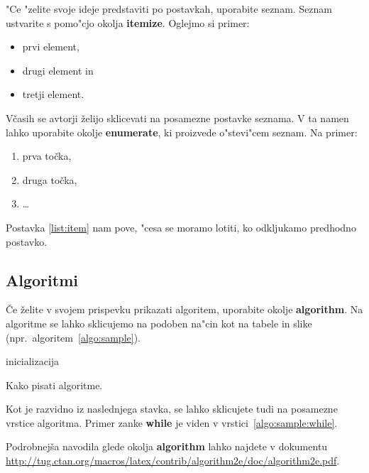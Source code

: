 \documentclass[sigconf,nonacm]{acmart}
\begin{document}
"Ce "zelite svoje ideje predstaviti po postavkah, uporabite seznam.  Seznam
ustvarite s pomo"cjo okolja \textbf{itemize}.  Oglejmo si primer:

\begin{itemize}
    \item prvi element,
    \item drugi element in
    \item tretji element.
\end{itemize}

Včasih se avtorji želijo sklicevati na posamezne postavke seznama.  V ta namen
lahko uporabite okolje \textbf{enumerate}, ki proizvede o"stevi"cem seznam.
Na primer:

\begin{enumerate}
    \item prva točka,
    \item\label{list:item} druga točka,
    \item \ldots
\end{enumerate}

Postavka \ref{list:item} nam pove, "cesa se moramo lotiti, ko odkljukamo
predhodno postavko.

\subsection{Algoritmi}

Če želite v svojem prispevku prikazati algoritem, uporabite okolje
\textbf{algorithm}.  Na algoritme se lahko sklicujemo na podoben na"cin kot na
tabele in slike (npr.\ algoritem~\ref{algo:sample}).

\begin{algorithm}
    \SetAlgoLined
    inicializacija\;
    \caption{Kako pisati algoritme.}
    \label{algo:sample}
\end{algorithm}

Kot je razvidno iz naslednjega stavka, se lahko sklicujete tudi na posamezne
vrstice algoritma.  Primer zanke \textbf{while} je viden v
vrstici~\ref{algo:sample:while}.

Podrobnejša navodila glede okolja
\textbf{algorithm} lahko najdete v dokumentu
\url{http://tug.ctan.org/macros/latex/contrib/algorithm2e/doc/algorithm2e.pdf}.
\end{document}
